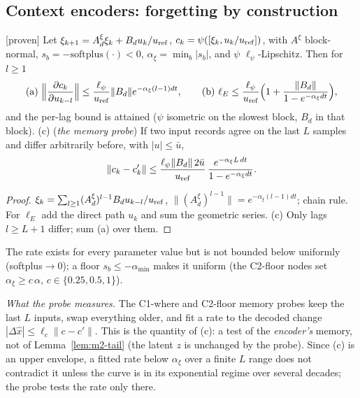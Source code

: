 \subsection{Context encoders: forgetting by construction}\label{sec:m2-ctx}

\begin{lemma}\label{lem:m2-sfm}
[proven] Let $\xi_{k+1}=A^\xi_d\xi_k+B_du_k/u_{\rm ref}$, $c_k=\psi([\xi_k,u_k/u_{\rm ref}])$, with $A^\xi$ block-normal,
$s_b=-\mathrm{softplus}(\cdot)<0$, $\alpha_\xi=\min_b|s_b|$, and $\psi$ $\ell_\psi$-Lipschitz. Then for $l\ge1$
\[
 \text{(a)}\ \Big\|\frac{\partial c_k}{\partial u_{k-l}}\Big\|\le\frac{\ell_\psi}{u_{\rm ref}}\|B_d\|e^{-\alpha_\xi(l-1)dt},\qquad
 \text{(b)}\ \ell_E\le\frac{\ell_\psi}{u_{\rm ref}}\Big(1+\frac{\|B_d\|}{1-e^{-\alpha_\xi dt}}\Big),
\]
and the per-lag bound is attained ($\psi$ isometric on the slowest block, $B_d$ in that block). (c) (\emph{the
memory probe}) If two input records agree on the last $L$ samples and differ arbitrarily before, with $|u|\le\bar u$,
\[
 \|c_k-c'_k\|\le\frac{\ell_\psi\|B_d\|\,2\bar u}{u_{\rm ref}}\,\frac{e^{-\alpha_\xi L\,dt}}{1-e^{-\alpha_\xi dt}} .
\]
\end{lemma}
\begin{proof}
$\xi_k=\sum_{l\ge1}(A^\xi_d)^{l-1}B_du_{k-l}/u_{\rm ref}$, $\|(A^\xi_d)^{l-1}\|=e^{-\alpha_\xi(l-1)dt}$; chain rule. For $\ell_E$
add the direct path $u_k$ and sum the geometric series. (c) Only lags $l\ge L+1$ differ; sum (a) over them.
\end{proof}
The rate exists for every parameter value but is not bounded below uniformly (softplus$\to0$); a floor
$s_b\le-\alpha_{\min}$ makes it uniform (the C2-floor nodes set $\alpha_\xi\ge c\,\alpha$, $c\in\{0.25,0.5,1\}$).

\emph{What the probe measures.} The C1-where and C2-floor memory probes keep the last $L$ inputs, swap everything
older, and fit a rate to the decoded change $|\Delta\hat x|\le\ell_c\|c-c'\|$. This is the quantity of (c): a test of
the \emph{encoder's} memory, not of Lemma~\ref{lem:m2-tail} (the latent $z$ is unchanged by the probe). Since (c) is an
upper envelope, a fitted rate below $\alpha_\xi$ over a finite $L$ range does not contradict it unless the curve is in
its exponential regime over several decades; the probe tests the rate only there.

